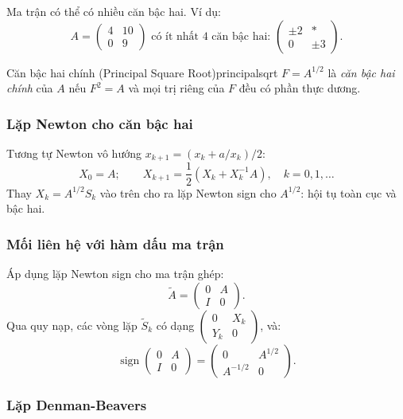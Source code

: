 \documentclass[12pt,a4paper]{report}
\newcommand{\sign}{\operatorname{sign}}
\begin{document}
Ma trận có thể có nhiều căn bậc hai. Ví dụ:
\[
  A = \begin{pmatrix} 4 & 10 \\ 0 & 9 \end{pmatrix}
  \text{ có ít nhất 4 căn bậc hai: }
  \begin{pmatrix} \pm 2 & * \\ 0 & \pm 3 \end{pmatrix}.
\]

\begin{definition}{Căn bậc hai chính (Principal Square Root)}{principalsqrt}
$F = A^{1/2}$ là \emph{căn bậc hai chính} của $A$ nếu $F^2 = A$ và mọi trị riêng của
$F$ đều có phần thực dương.
\end{definition}

\subsubsection{Lặp Newton cho căn bậc hai}

Tương tự Newton vô hướng $x_{k+1} = (x_k + a/x_k)/2$:
\[
  X_0 = A; \qquad X_{k+1} = \frac{1}{2}(X_k + X_k^{-1}A), \quad k = 0, 1, \ldots
\]
Thay $X_k = A^{1/2} S_k$ vào trên cho ra lặp Newton sign cho $A^{1/2}$: hội tụ toàn
cục và bậc hai.

\subsubsection{Mối liên hệ với hàm dấu ma trận}

Áp dụng lặp Newton sign cho ma trận ghép:
\[
  \tilde{A} = \begin{pmatrix} 0 & A \\ I & 0 \end{pmatrix}.
\]
Qua quy nạp, các vòng lặp $\tilde{S}_k$ có dạng $\begin{pmatrix} 0 & X_k \\ Y_k & 0 \end{pmatrix}$,
và:
\[
  \sign\!\begin{pmatrix} 0 & A \\ I & 0 \end{pmatrix}
  = \begin{pmatrix} 0 & A^{1/2} \\ A^{-1/2} & 0 \end{pmatrix}.
\]

\subsubsection{Lặp Denman-Beavers}
\end{document}
